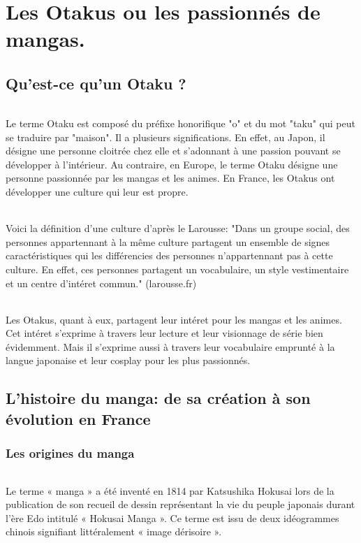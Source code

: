 \part{Les Otakus ou les passionnés de mangas.}
\chapter{Qu'est-ce qu'un Otaku ?}
\paragraph{}
Le terme Otaku est composé du préfixe honorifique "o" et du mot "taku" qui peut se traduire par "maison". Il a plusieurs significations. En effet, au Japon, il désigne une personne cloitrée chez elle et s'adonnant à une passion pouvant se développer à l'intérieur. Au contraire, en Europe, le terme Otaku désigne une personne passionnée par les mangas et les animes. En France, les Otakus ont développer une culture qui leur est propre.
\paragraph{}
Voici la définition d'une culture d'après le Larousse:
"Dans un groupe social, des personnes appartennant à la même culture partagent un ensemble de signes caractéristiques qui les différencies des personnes n'appartennant pas à cette culture. En effet, ces personnes partagent un vocabulaire, un style vestimentaire et un centre d'intéret commun." (larousse.fr)
\paragraph{}
Les Otakus, quant à eux, partagent leur intéret pour les mangas et les animes. Cet intéret s'exprime à travers leur lecture et leur visionnage de série bien évidemment. Mais il s'exprime aussi à travers leur vocabulaire emprunté à la langue japonaise et leur cosplay pour les plus passionnés. 

\chapter{L'histoire du manga: de sa création à son évolution en France}

\section{Les origines du manga}
\paragraph{}
Le terme « manga » a été inventé en 1814 par Katsushika Hokusai lors de la publication de son recueil de dessin représentant la vie du peuple japonais durant l’ère Edo intitulé « Hokusai Manga ». Ce terme est issu de deux idéogrammes chinois signifiant littéralement « image dérisoire ». 

